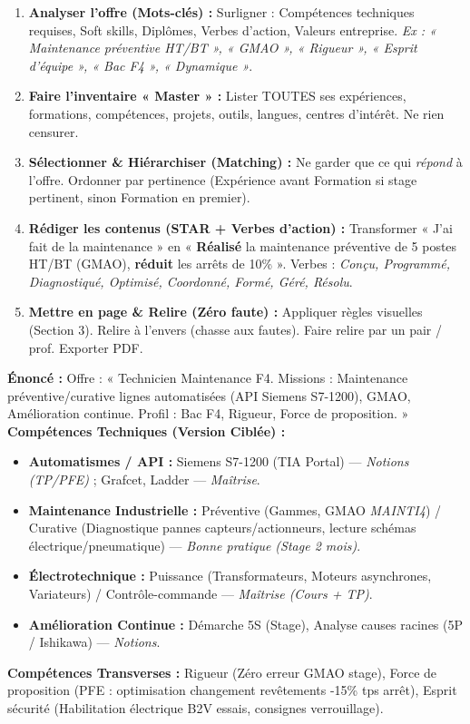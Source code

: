 \documentclass[11pt]{article}
\begin{document}
\begin{methode}
\begin{enumerate}
    \item \textbf{Analyser l'offre (Mots-clés) :} Surligner : Compétences techniques requises, Soft skills, Diplômes, Verbes d'action, Valeurs entreprise. \emph{Ex : « Maintenance préventive HT/BT », « GMAO », « Rigueur », « Esprit d'équipe », « Bac F4 », « Dynamique »}.
    \item \textbf{Faire l'inventaire « Master » :} Lister TOUTES ses expériences, formations, compétences, projets, outils, langues, centres d'intérêt. Ne rien censurer.
    \item \textbf{Sélectionner \& Hiérarchiser (Matching) :} Ne garder que ce qui \emph{répond} à l'offre. Ordonner par pertinence (Expérience avant Formation si stage pertinent, sinon Formation en premier).
    \item \textbf{Rédiger les contenus (STAR + Verbes d'action) :} Transformer « J'ai fait de la maintenance » en « \textbf{Réalisé} la maintenance préventive de 5 postes HT/BT (GMAO), \textbf{réduit} les arrêts de 10\% ». Verbes : \emph{Conçu, Programmé, Diagnostiqué, Optimisé, Coordonné, Formé, Géré, Résolu}.
    \item \textbf{Mettre en page \& Relire (Zéro faute) :} Appliquer règles visuelles (Section 3). Relire à l'envers (chasse aux fautes). Faire relire par un pair / prof. Exporter PDF.
\end{enumerate}
\end{methode}

\begin{exoresolu}
\textbf{Énoncé :} Offre : « Technicien Maintenance F4. Missions : Maintenance préventive/curative lignes automatisées (API Siemens S7-1200), GMAO, Amélioration continue. Profil : Bac F4, Rigueur, Force de proposition. »
\tcblower
\textbf{Compétences Techniques (Version Ciblée) :}
\begin{itemize}
    \item \textbf{Automatismes / API :} Siemens S7-1200 (TIA Portal) — \emph{Notions (TP/PFE)} ; Grafcet, Ladder — \emph{Maîtrise}.
    \item \textbf{Maintenance Industrielle :} Préventive (Gammes, GMAO \emph{MAINTI4}) / Curative (Diagnostique pannes capteurs/actionneurs, lecture schémas électrique/pneumatique) — \emph{Bonne pratique (Stage 2 mois)}.
    \item \textbf{Électrotechnique :} Puissance (Transformateurs, Moteurs asynchrones, Variateurs) / Contrôle-commande — \emph{Maîtrise (Cours + TP)}.
    \item \textbf{Amélioration Continue :} Démarche 5S (Stage), Analyse causes racines (5P / Ishikawa) — \emph{Notions}.
\end{itemize}
\textbf{Compétences Transverses :} Rigueur (Zéro erreur GMAO stage), Force de proposition (PFE : optimisation changement revêtements -15\% tps arrêt), Esprit sécurité (Habilitation électrique B2V essais, consignes verrouillage).
\end{exoresolu}
\end{document}
